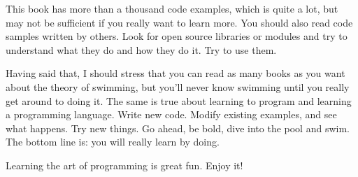 This book has more than a thousand code examples, which is quite 
a lot, but may not be sufficient if you really want to learn more. 
You should also read code samples written by others. Look for 
open source libraries or modules and try to understand what they 
do and how they do it. Try to use them.

Having said that, I should stress that you can read as many books 
as you want about the theory of swimming, but you'll never know 
swimming until you really get around to doing it. The same is true 
about learning to program and learning a programming 
language. Write new code. Modify existing examples, and see what 
happens. Try new things. Go ahead, be bold, dive into the pool and
swim. The bottom line is: you will really learn by doing.

Learning the art of programming is great fun. Enjoy it!

